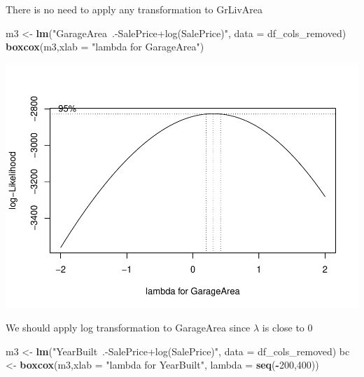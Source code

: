 \documentclass[
]{article}
\newenvironment{Shaded}{\begin{snugshade}}{\end{snugshade}}
\newcommand{\DataTypeTok}[1]{\textcolor[rgb]{0.13,0.29,0.53}{#1}}
\newcommand{\DecValTok}[1]{\textcolor[rgb]{0.00,0.00,0.81}{#1}}
\newcommand{\KeywordTok}[1]{\textcolor[rgb]{0.13,0.29,0.53}{\textbf{#1}}}
\newcommand{\NormalTok}[1]{#1}
\newcommand{\OperatorTok}[1]{\textcolor[rgb]{0.81,0.36,0.00}{\textbf{#1}}}
\newcommand{\StringTok}[1]{\textcolor[rgb]{0.31,0.60,0.02}{#1}}
\begin{document}
There is no need to apply any transformation to GrLivArea

\begin{Shaded}
\begin{Highlighting}[]
\NormalTok{m3 <-}\StringTok{ }\KeywordTok{lm}\NormalTok{(}\StringTok{"GarageArea~.-SalePrice+log(SalePrice)"}\NormalTok{, }\DataTypeTok{data =}\NormalTok{ df_cols_removed)}
\KeywordTok{boxcox}\NormalTok{(m3,}\DataTypeTok{xlab =} \StringTok{"lambda for GarageArea"}\NormalTok{)}
\end{Highlighting}
\end{Shaded}

\includegraphics{Final-Project_files/figure-latex/unnamed-chunk-21-1.pdf}

We should apply log transformation to GarageArea since \(\lambda\) is close to 0

\begin{Shaded}
\begin{Highlighting}[]
\NormalTok{m3 <-}\StringTok{ }\KeywordTok{lm}\NormalTok{(}\StringTok{"YearBuilt~.-SalePrice+log(SalePrice)"}\NormalTok{, }\DataTypeTok{data =}\NormalTok{ df_cols_removed)}
\NormalTok{bc <-}\StringTok{ }\KeywordTok{boxcox}\NormalTok{(m3,}\DataTypeTok{xlab =} \StringTok{"lambda for YearBuilt"}\NormalTok{, }\DataTypeTok{lambda =} \KeywordTok{seq}\NormalTok{(}\OperatorTok{-}\DecValTok{200}\NormalTok{,}\DecValTok{400}\NormalTok{))}
\end{Highlighting}
\end{Shaded}
\end{document}
